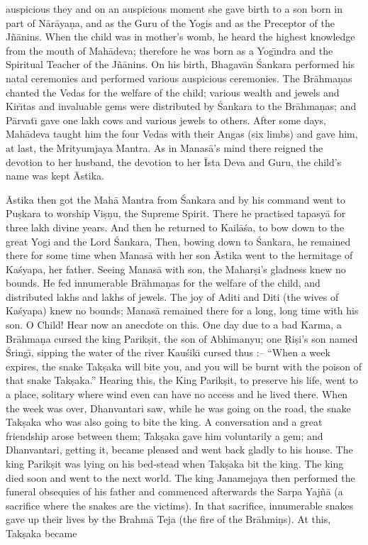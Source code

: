 auspicious they and on an auspicious moment she gave birth to a son born in part of N\=ar\=aya\d{n}a, and as the Guru of the Yogis and as the Preceptor of the J\~n\=anins. When the child was in mother's womb, he heard the highest knowledge from the mouth of Mah\=adeva; therefore he was born as a Yog\={\i}ndra and the Spiritual Teacher of the J\~n\=anins. On his birth, Bhagav\=an \'Sankara performed his natal ceremonies and performed various auspicious ceremonies. The Br\=ahma\d{n}as chanted the Vedas for the welfare of the child; various wealth and jewels and Kir\={\i}tas and invaluable gems were distributed by \'Sankara to the Br\=ahma\d{n}as; and P\=arvat\={\i} gave one lakh cows and various jewels to others. After some days, Mah\=adeva taught him the four Vedas with their Angas (six limbs) and gave him, at last, the Mrityumjaya Mantra. As in Manas\=a's mind there reigned the devotion to her husband, the devotion to her \=Ista Deva and Guru, the child's name was kept \=Astika.

\=Astika then got the Mah\=a Mantra from \'Sankara and by his command went to Pu\d{s}kara to worship Vi\d{s}\d{n}u, the Supreme Spirit. There he practised tapasy\=a for three lakh divine years. And then he returned to Kail\=a\'sa, to bow down to the great Yogi and the Lord \'Sankara, Then, bowing down to \'Sankara, he remained there for some time when Manas\=a with her son \=Astika went to the hermitage of Ka\'syapa, her father. Seeing Manas\=a with son, the Mahar\d{s}i's gladness knew no bounds. He fed innumerable Br\=ahma\d{n}as for the welfare of the child, and distributed lakhs and lakhs of jewels. The joy of Aditi and Diti (the wives of Ka\'syapa) knew no bounds; Manas\=a remained there for a long, long time with his son. O Child! Hear now an anecdote on this. One day due to a bad Karma, a Br\=ahma\d{n}a cursed the king Parik\d{s}it, the son of Abhimanyu; one \d{R}i\d{s}i's son named \'Sring\={\i}, sipping the water of the river Kau\'sik\={\i} cursed thus :-- ``When a week expires, the snake Tak\d{s}aka will bite you, and you will be burnt with the poison of that snake Tak\d{s}aka.'' Hearing this, the King Parik\d{s}it, to preserve his life, went to a place, solitary where wind even can have no access and he lived there. When the week was over, Dhanvantari saw, while he was going on the road, the snake Tak\d{s}aka who was also going to bite the king. A conversation and a great friendship arose between them; Tak\d{s}aka gave him voluntarily a gem; and Dhanvantari, getting it, became pleased and went back gladly to his house. The king Parik\d{s}it was lying on his bed-stead when Tak\d{s}aka bit the king. The king died soon and went to the next world. The king Janamejaya then performed the funeral obsequies of his father and commenced afterwards the Sarpa Yaj\~n\=a (a sacrifice where the snakes are the victims). In that sacrifice, innumerable snakes gave up their lives by the Brahm\=a Teja (the fire of the Br\=ahmi\d{n}s). At this, Tak\d{s}aka became


